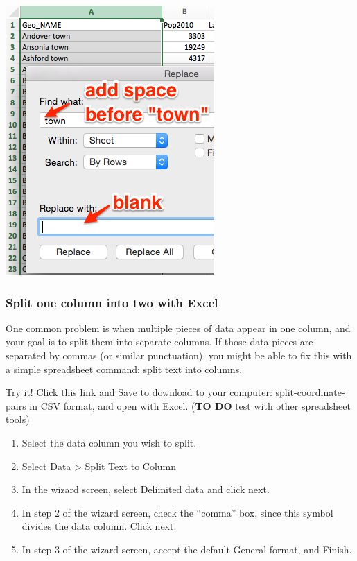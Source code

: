 \documentclass[
  english,
]{book}
\begin{document}
\includegraphics{images/04-clean/find-replace-blank.png}

\hypertarget{split-one-column-into-two-with-excel}{%
\subsubsection*{Split one column into two with Excel}\label{split-one-column-into-two-with-excel}}

One common problem is when multiple pieces of data appear in one column, and your goal is to split them into separate columns. If those data pieces are separated by commas (or similar punctuation), you might be able to fix this with a simple spreadsheet command: split text into columns.

Try it! Click this link and Save to download to your computer: \href{data/split-coordinate-pairs.csv}{split-coordinate-pairs in CSV format}, and open with Excel. (\textbf{TO DO} test with other spreadsheet tools)

\begin{enumerate}
\def\labelenumi{\arabic{enumi}.}
\item
  Select the data column you wish to split.
\item
  Select Data \textgreater{} Split Text to Column
\item
  In the wizard screen, select Delimited data and click next.
\item
  In step 2 of the wizard screen, check the ``comma'' box, since this symbol divides the data column. Click next.
\item
  In step 3 of the wizard screen, accept the default General format, and Finish.
\end{enumerate}
\end{document}
